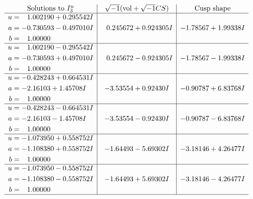 \documentclass[1p]{elsarticle_modified}
\theoremstyle{definition}
\newcommand{\I}{\sqrt{-1}}
\begin{document}
$$\begin{array}{c|c|c}  
\text{Solutions to }I^u_{3}& \I (\text{vol} + \sqrt{-1}CS) & \text{Cusp shape}\\
 \hline 
\begin{aligned}
u &= \phantom{-}1.002190 + 0.295542 I \\
a &= -0.730593 - 0.497010 I \\
b &= \phantom{-}1.00000\phantom{ +0.000000I}\end{aligned}
 & \phantom{-}0.245672 + 0.924305 I & -1.78567 + 1.99338 I \\ \hline\begin{aligned}
u &= \phantom{-}1.002190 - 0.295542 I \\
a &= -0.730593 + 0.497010 I \\
b &= \phantom{-}1.00000\phantom{ +0.000000I}\end{aligned}
 & \phantom{-}0.245672 - 0.924305 I & -1.78567 - 1.99338 I \\ \hline\begin{aligned}
u &= -0.428243 + 0.664531 I \\
a &= -2.16103 + 1.45708 I \\
b &= \phantom{-}1.00000\phantom{ +0.000000I}\end{aligned}
 & -3.53554 + 0.92430 I & -0.90787 + 6.83768 I \\ \hline\begin{aligned}
u &= -0.428243 - 0.664531 I \\
a &= -2.16103 - 1.45708 I \\
b &= \phantom{-}1.00000\phantom{ +0.000000I}\end{aligned}
 & -3.53554 - 0.92430 I & -0.90787 - 6.83768 I \\ \hline\begin{aligned}
u &= -1.073950 + 0.558752 I \\
a &= -1.108380 + 0.558752 I \\
b &= \phantom{-}1.00000\phantom{ +0.000000I}\end{aligned}
 & -1.64493 - 5.69302 I & -3.18146 + 4.26477 I \\ \hline\begin{aligned}
u &= -1.073950 - 0.558752 I \\
a &= -1.108380 - 0.558752 I \\
b &= \phantom{-}1.00000\phantom{ +0.000000I}\end{aligned}
 & -1.64493 + 5.69302 I & -3.18146 - 4.26477 I\\
 \hline 
 \end{array}$$\newpage\newpage\renewcommand{\arraystretch}{1}
\end{document}
